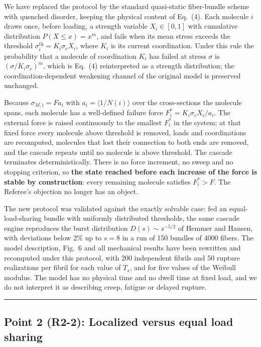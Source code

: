 \documentclass[11pt]{article}
\newcommand{\pointseparator}{%
  \par\bigskip
  {\color{rulegray}\hrule}
  \par\bigskip
}
\begin{document}
We have replaced the protocol by the standard quasi-static fiber-bundle scheme
with quenched disorder, keeping the physical content of Eq.~(4). Each molecule
$i$ draws once, before loading, a strength variable $X_i\in[0,1]$ with cumulative
distribution $P(X\le x)=x^{m}$, and fails when its mean stress exceeds the
threshold $\sigma^{\mathrm{th}}_i = K_i\sigma_c X_i$, where $K_i$ is its current
coordination. Under this rule the probability that a molecule of coordination
$K_i$ has failed at stress $\sigma$ is $(\sigma/K_i\sigma_c)^{m}$, which is
Eq.~(4) reinterpreted as a strength distribution; the coordination-dependent
weakening channel of the original model is preserved unchanged.

Because $\sigma_{M,i}=Fa_i$ with $a_i=\langle 1/N(i)\rangle$ over the
cross-sections the molecule spans, each molecule has a well-defined failure
force $F^{*}_i = K_i\sigma_c X_i/a_i$. The external force is raised continuously
to the smallest $F^{*}_i$ in the system; at that fixed force every molecule
above threshold is removed, loads and coordinations are recomputed, molecules
that lost their connection to both ends are removed, and the cascade repeats
until no molecule is above threshold. The cascade terminates deterministically.
There is no force increment, no sweep and no stopping criterion, so
\textbf{the state reached before each increase of the force is stable by
construction}: every remaining molecule satisfies $F^{*}_i > F$. The Referee's
objection no longer has an object.

The new protocol was validated against the exactly solvable case: fed an
equal-load-sharing bundle with uniformly distributed thresholds, the same
cascade engine reproduces the burst distribution $D(s)\sim s^{-5/2}$ of Hemmer
and Hansen, with deviations below 2\% up to $s=8$ in a run of 150 bundles of
4000 fibers. The model description, Fig.~6 and all mechanical results have been
rewritten and recomputed under this protocol, with 200 independent fibrils and
50 rupture realizations per fibril for each value of $T_s$, and for five values
of the Weibull modulus. The model has no physical time and no dwell time at
fixed load, and we do not interpret it as describing creep, fatigue or delayed
rupture.


\pointseparator


\subsection*{Point 2 (R2-2): Localized versus equal load sharing}
\end{document}
